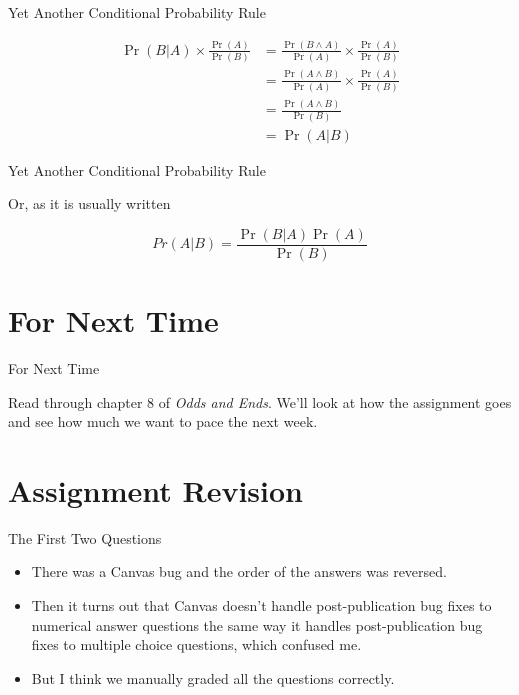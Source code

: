 \documentclass[
  ignorenonframetext,
]{beamer}
\providecommand{\tightlist}{%
  \setlength{\itemsep}{0pt}\setlength{\parskip}{0pt}}
\renewcommand{\,}{\text{, }}
\begin{document}
\begin{frame}{Yet Another Conditional Probability Rule}
\protect\hypertarget{yet-another-conditional-probability-rule}{}

\begin{align*}
\Pr(B | A) \times \frac{\Pr(A)}{\Pr(B)} &= \frac{\Pr(B \wedge A)}{\Pr(A)}  \times \frac{\Pr(A)}{\Pr(B)} \\
 &= \frac{\Pr(A \wedge B)}{\Pr(A)}  \times \frac{\Pr(A)}{\Pr(B)}  \\
 &= \frac{\Pr(A \wedge B)}{\Pr(B)} \\
 &= \Pr(A | B)
\end{align*}

\end{frame}

\begin{frame}{Yet Another Conditional Probability Rule}
\protect\hypertarget{yet-another-conditional-probability-rule-1}{}

Or, as it is usually written

\[
Pr(A | B) = \frac{\Pr(B | A)\Pr(A)}{\Pr(B)}
\]

\end{frame}

\hypertarget{for-next-time-4}{%
\section{For Next Time}\label{for-next-time-4}}

\begin{frame}{For Next Time}
\protect\hypertarget{for-next-time-5}{}

Read through chapter 8 of \emph{Odds and Ends}. We'll look at how the
assignment goes and see how much we want to pace the next week.

\end{frame}

\hypertarget{assignment-revision}{%
\section{Assignment Revision}\label{assignment-revision}}

\begin{frame}{The First Two Questions}
\protect\hypertarget{the-first-two-questions}{}

\begin{itemize}
\tightlist
\item
  There was a Canvas bug and the order of the answers was reversed.
\item
  Then it turns out that Canvas doesn't handle post-publication bug
  fixes to numerical answer questions the same way it handles
  post-publication bug fixes to multiple choice questions, which
  confused me.
\item
  But I think we manually graded all the questions correctly.
\end{itemize}

\end{frame}
\end{document}
